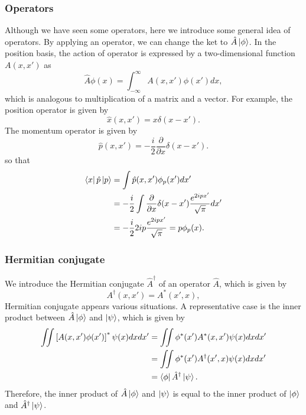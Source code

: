 \documentclass{book}
\begin{document}
\subsubsection{Operators}
Although we have seen some operators, here we introduce some general idea of operators. By applying an operator, we can change the ket to $\hat A \ket \phi$. In the position basis,  the action of operator is expressed by a two-dimensional function $A(x,x')$ as
\begin{equation}
  \hat A\phi(x) = \int_{-\infty}^{\infty}A(x,x')\phi(x')dx,
\end{equation}
which is analogous to multiplication of a matrix and a vector. For example, the position operator is given by
\begin{equation}
  \hat x(x,x') = x\delta(x-x').
\end{equation}
The momentum operator is given by
\begin{equation}
  \hat p(x,x') = -\frac{i}{2}\frac{\partial}{\partial x}\delta(x-x').
\end{equation}
so that 
\begin{equation}
\begin{aligned}	
  \bra x\hat p\ket p &= \int \hat p(x,x')\phi_p(x')dx' \\
  &= -\frac i 2 \int \frac{\partial}{\partial x}\delta(x-x')\frac{e^{2ipx'}}{\sqrt \pi}dx' \\
  &= -\frac i 2 2ip\frac{e^{2ipx'}}{\sqrt \pi} = p\phi_p(x).
\end{aligned}
\end{equation}

\subsubsection{Hermitian conjugate}
We introduce the Hermitian conjugate $\hat A^\dagger$ of an operator $\hat A$, which is given by
\begin{equation}
  A^\dagger(x,x') = A^*(x',x),
\end{equation}
Hermitian conjugate appears various situations. A representative case is the inner product between $\hat A\ket \phi$ and $\ket \psi$, which is given by
\begin{equation}
\begin{aligned}
	  \iint\left[A(x,x')\phi(x')\right]^*\psi(x)dxdx' &= \iint \phi^*(x')A^*(x,x')\psi(x)dxdx' \\
	  &= \iint \phi^*(x')A^\dagger(x',x)\psi(x)dxdx'\\
	  &= \bra \phi \hat A^\dagger \ket \psi.
\end{aligned}
\end{equation}
Therefore, the inner product of $\hat A \ket \phi$ and $\ket \psi$ is equal to the inner product of $\ket \phi$ and $\hat A^\dagger \ket \psi$.
\end{document}
